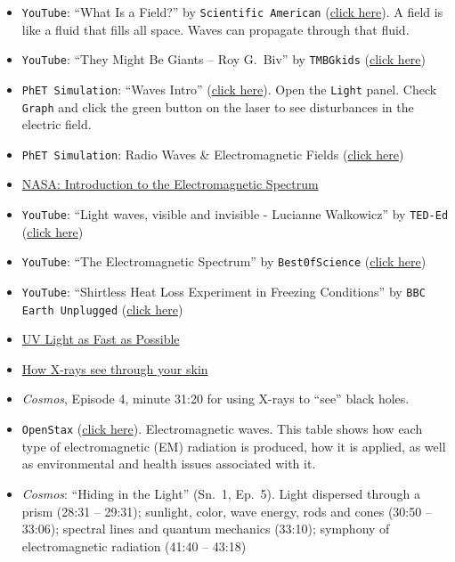 \documentclass[main.tex]{subfiles}
\begin{document}
\begin{itemize}
\setlength\itemsep{0.1ex}
    \item \texttt{YouTube}: ``What Is a Field?'' by \texttt{Scientific American} (\href{https://youtu.be/7BK166SL-ig}{click here}). A field is like a fluid that fills all space. Waves can propagate through that fluid.
    \item \texttt{YouTube}: ``They Might Be Giants -- Roy G.~Biv'' by \texttt{TMBGkids} (\href{https://youtu.be/Gf33ueRXMzQ}{click here})
    \item \texttt{PhET Simulation}: ``Waves Intro'' (\href{https://phet.colorado.edu/sims/html/waves-intro/latest/waves-intro_en.html}{click here}). Open the \texttt{Light} panel. Check \texttt{Graph} and click the green button on the laser to see disturbances in the electric field.
    \item \texttt{PhET Simulation}: Radio Waves \& Electromagnetic Fields (\href{https://phet.colorado.edu/sims/cheerpj/radio-waves/latest/radio-waves.html?simulation=radio-waves}{click here})
    \item \href{https://science.nasa.gov/ems/01_intro}{NASA: Introduction to the Electromagnetic Spectrum}
    \item \texttt{YouTube}: ``Light waves, visible and invisible - Lucianne Walkowicz'' by \texttt{TED-Ed} (\href{https://youtu.be/O0PawPSdk28}{click here})
    \item \texttt{YouTube}: ``The Electromagnetic Spectrum'' by \texttt{Best0fScience} (\href{https://youtu.be/cfXzwh3KadE}{click here})
    \item \texttt{YouTube}: ``Shirtless Heat Loss Experiment in Freezing Conditions'' by \texttt{BBC Earth Unplugged} (\href{https://youtu.be/o2bzGyc6WAg}{click here})
    \item \href{https://youtu.be/QALt_ja2HGY}{UV Light as Fast as Possible}
    \item \href{https://youtu.be/gsV7SJDDCY4}{How X-rays see through your skin}
    \item \textit{Cosmos}, Episode 4, minute 31:20 for using X-rays to ``see'' black holes.
    \item \texttt{OpenStax} (\href{https://openstax.org/books/physics/pages/15-1-the-electromagnetic-spectrum#Table_15_01}{click here}). Electromagnetic waves. This table shows how each type of electromagnetic (EM) radiation is produced, how it is applied, as well as environmental and health issues associated with it.
    \item \textit{Cosmos}: ``Hiding in the Light'' (Sn.~1, Ep.~5). Light dispersed through a prism (28:31 -- 29:31); sunlight, color, wave energy, rods and cones (30:50 -- 33:06); spectral lines and quantum mechanics (33:10); symphony of electromagnetic radiation (41:40 -- 43:18)
\end{itemize}

\clearpage
\printnoidxglossaries
\end{document}
